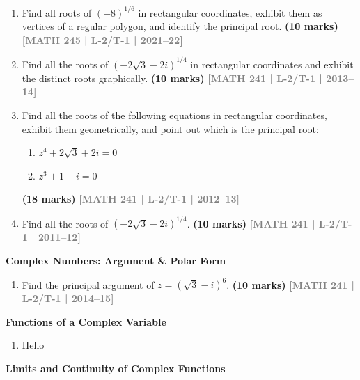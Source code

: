 \documentclass[12pt,a3paper]{article}
\newcommand{\yr}[1]{\hfill\textcolor{gray}{\small\textbf{[#1]}}}
\newcommand{\mk}[1]{\textcolor{orange!70!black}{\small\textbf{(#1 marks)}}}
\newcommand{\subtopic}[2]{%
  \vspace{10pt}
  \noindent\begin{tcolorbox}[colback=#1!8,colframe=#1,boxrule=0.6pt,arc=4pt,
    left=6pt,right=6pt,top=4pt,bottom=4pt]
    \small\bfseries\textcolor{#1}{#2}
  \end{tcolorbox}
  \vspace{2pt}
}
\begin{document}
\begin{enumerate}

    
\item Find all roots of $(-8)^{1/6}$ in rectangular coordinates, exhibit them as vertices of a regular polygon, and identify the principal root.
\mk{10} \yr{MATH 245 | L-2/T-1 | 2021--22}

    
    
\item Find all the roots of $(-2\sqrt{3}-2i)^{1/4}$ in rectangular coordinates and exhibit the distinct roots graphically.
\mk{10} \yr{MATH 241 | L-2/T-1 | 2013--14}


\item Find all the roots of the following equations in rectangular coordinates, exhibit them geometrically, and point out which is the principal root:
\begin{enumerate}
  \item $z^{4}+2\sqrt{3}+2i=0$
  \item $z^{3}+1-i=0$
\end{enumerate}
\mk{18} \yr{MATH 241 | L-2/T-1 | 2012--13}


\item Find all the roots of $(-2\sqrt{3}-2i)^{1/4}$.
\mk{10} \yr{MATH 241 | L-2/T-1 | 2011--12}


\end{enumerate}

\subtopic{cE}{Complex Numbers: Argument \& Polar Form}
\label{sub:s5-complexnums}

\begin{enumerate}
    
    \item Find the principal argument of $z=(\sqrt{3}-i)^{6}$.
\mk{10} \yr{MATH 241 | L-2/T-1 | 2014--15}


\end{enumerate}

\subtopic{cE}{Functions of a Complex Variable}
\label{sub:s5-functions}

\begin{enumerate}\item Hello \end{enumerate}

\subtopic{cE}{Limits and Continuity of Complex Functions}
\label{sub:s5-limcont}
\end{document}
